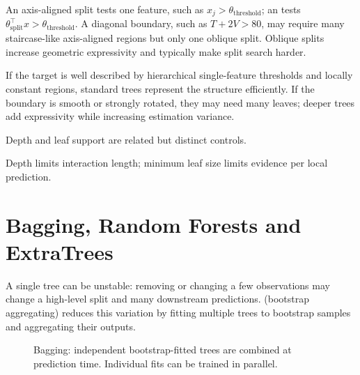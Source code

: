 An axis-aligned split tests one feature, such as $x_j>\theta_{\text{threshold}}$; an  tests $\theta_{\text{split}}^\top x>\theta_{\text{threshold}}$.
A diagonal boundary, such as $T+2V>80$, may require many staircase-like axis-aligned regions but only one oblique split.
Oblique splits increase geometric expressivity and typically make split search harder.

\begin{calloutbias}
If the target is well described by hierarchical single-feature thresholds and locally constant regions, standard trees represent the structure efficiently.
If the boundary is smooth or strongly rotated, they may need many leaves; deeper trees add expressivity while increasing estimation variance.
\end{calloutbias}
Depth and leaf support are related but distinct controls.
\begin{calloutmemoryhook}
Depth limits interaction length; minimum leaf size limits evidence per local prediction.
\end{calloutmemoryhook}

\section{Bagging, Random Forests and ExtraTrees}
\label{sec:trees-bagging-random-forests-and-extratrees}
A single tree can be unstable: removing or changing a few observations may change a high-level split and many downstream predictions.
 (bootstrap aggregating) reduces this variation by fitting multiple trees to bootstrap samples and aggregating their outputs.

\begin{figure}[htbp]\centering
{}
\caption{Bagging: independent bootstrap-fitted trees are combined at prediction time.
Individual fits can be trained in parallel.}
\label{fig:tree_bagging}
\end{figure}

